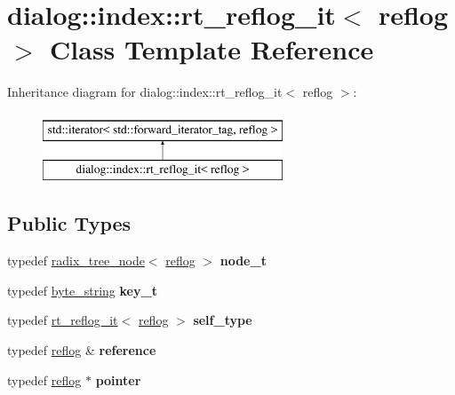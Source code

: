 \hypertarget{classdialog_1_1index_1_1rt__reflog__it}{}\section{dialog\+:\+:index\+:\+:rt\+\_\+reflog\+\_\+it$<$ reflog $>$ Class Template Reference}
\label{classdialog_1_1index_1_1rt__reflog__it}
Inheritance diagram for dialog\+:\+:index\+:\+:rt\+\_\+reflog\+\_\+it$<$ reflog $>$\+:\begin{figure}[H]
\begin{center}
\leavevmode
\includegraphics[height=2.000000cm]{classdialog_1_1index_1_1rt__reflog__it}
\end{center}
\end{figure}
\subsection*{Public Types}
\begin{DoxyCompactItemize}
\item 
\mbox{\label{classdialog_1_1index_1_1rt__reflog__it_afe71079375b6d14c69582edc4c67620f}} 
typedef \hyperlink{structdialog_1_1index_1_1radix__tree__node}{radix\+\_\+tree\+\_\+node}$<$ \hyperlink{classdialog_1_1monolog_1_1monolog__exp2__linear}{reflog} $>$ {\bfseries node\+\_\+t}
\item 
\mbox{\label{classdialog_1_1index_1_1rt__reflog__it_aa870823322e7ac72f3282e663336356b}} 
typedef \hyperlink{classdialog_1_1byte__string}{byte\+\_\+string} {\bfseries key\+\_\+t}
\item 
\mbox{\label{classdialog_1_1index_1_1rt__reflog__it_a684d45937aeedcc0deb4f0f357efb480}} 
typedef \hyperlink{classdialog_1_1index_1_1rt__reflog__it}{rt\+\_\+reflog\+\_\+it}$<$ \hyperlink{classdialog_1_1monolog_1_1monolog__exp2__linear}{reflog} $>$ {\bfseries self\+\_\+type}
\item 
\mbox{\label{classdialog_1_1index_1_1rt__reflog__it_aa7a279113eed81533102d13726d252f6}} 
typedef \hyperlink{classdialog_1_1monolog_1_1monolog__exp2__linear}{reflog} \& {\bfseries reference}
\item 
\mbox{\label{classdialog_1_1index_1_1rt__reflog__it_ac3e4f2e176d084dd0a24f4419505430b}} 
typedef \hyperlink{classdialog_1_1monolog_1_1monolog__exp2__linear}{reflog} $\ast$ {\bfseries pointer}
\end{DoxyCompactItemize}
